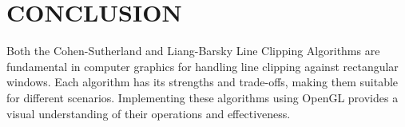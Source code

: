 \documentclass{article}
\begin{document}
\section*{CONCLUSION}
Both the Cohen-Sutherland and Liang-Barsky Line Clipping Algorithms are fundamental in computer graphics for handling line clipping against rectangular windows. Each algorithm has its strengths and trade-offs, making them suitable for different scenarios. Implementing these algorithms using OpenGL provides a visual understanding of their operations and effectiveness.
\end{document}
